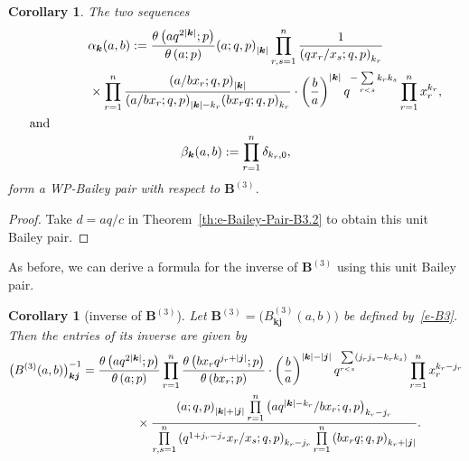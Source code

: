\documentclass[pdftex]{sigma}
\numberwithin{equation}{section}
\newtheorem{Corollary}[Theorem]{Corollary}
\newcommand\sumj{{\left| \boldsymbol {j} \right|}}
\newcommand\sumk{{\left| \boldsymbol{k} \right|}}
\newcommand{\B}{{ \mathbf B}}
\renewcommand{\k}{{ \boldsymbol{k}}}
\renewcommand{\j}{{ \boldsymbol{j}}}
\newcommand{\sqprod}[1]{\prod\limits_{r, s =1}^{#1}} %
\newcommand{\smallprod}[1]{\prod\limits_{r =1}^{#1}} %
\newcommand{\xover}[1]{#1_{r}/#1_{s}}
\newcommand{\ellipticqrfac}[2]{{\left({#1}; q, p\right)_{#2}}} %
\newcommand{\elliptictheta}[1]{\theta \left({#1} ; p\right) }
\begin{document}
\begin{Corollary}\label{e-Bailey-Pair-B3-1} The two sequences
\begin{gather*}
\alpha_\k(a,b) := \frac{\elliptictheta{aq^{2\sumk}}}{\elliptictheta{a}}
 \ellipticqrfac{a}{\sumk}
\sqprod n\frac{1}{\ellipticqrfac{q\xover x}{k_r}} \notag\\
\hphantom{\alpha_\k(a,b) :=}{} \times \smallprod n \frac {\ellipticqrfac{a/bx_r}{\sumk}}{\ellipticqrfac{a/bx_r} {\sumk-k_r}
\ellipticqrfac{bx_rq}{k_r}} \cdot \left( \frac{b}{a}\right)^{\sumk} q^{-\sum\limits_{r<s} k_rk_s} \smallprod n x_r^{k_r}, \\
\intertext{and}
\beta_\k(a,b) := \smallprod n \delta_{k_r, 0} ,
\end{gather*}
form a WP-Bailey pair with respect to $\B^{(3)}$.
\end{Corollary}
\begin{proof} Take $d=aq/c$ in Theorem~\ref{th:e-Bailey-Pair-B3.2} to obtain this unit Bailey pair.
\end{proof}
As before, we can derive a formula for the inverse of $\B^{(3)}$ using this unit Bailey pair.
\begin{Corollary}[inverse of $\B^{(3)}$]\label{cor:e-B3-inverse}
Let $\B^{(3)}= \big(B^{(3)}_{\k\j}(a,b)\big)$ be defined by~\eqref{e-B3}. Then the entries of its inverse are given by
\begin{gather}
\big(B^{(3)}(a,b)\big)_{\k \j}^{-1} =
\frac{\elliptictheta{aq^{2\sumk}}}{\elliptictheta{a}}
\smallprod n \frac{\elliptictheta{bx_rq^{j_r+\sumj}}}{\elliptictheta{bx_r}}
\cdot \left( \frac{b}{a}\right)^{\sumk-\sumj}
q^{\sum\limits_{r<s}(j_rj_s- k_rk_s)}
\smallprod n x_r^{k_r-j_r}\nonumber\\
\hphantom{\big(B^{(3)}(a,b)\big)_{\k \j}^{-1} =}{}
\times \frac{\ellipticqrfac{a}{\sumk+\sumj} \smallprod n \ellipticqrfac{aq^{\sumk-k_r}/bx_r}{k_r-j_r}}
{\sqprod n \ellipticqrfac{q^{1+j_r-j_s}\xover x }{k_r-j_r} \smallprod n \ellipticqrfac{bx_rq}{k_r+\sumj}} .\label{e-B3-inverse}
\end{gather}
\end{Corollary}
\end{document}
